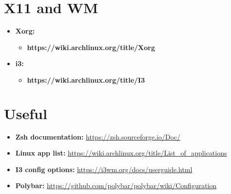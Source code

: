 \documentclass[10pt, a4paper, onecolumn, oneside, titlepage, openany]{book}
\begin{document}
\section{X11 and WM}
\begin{itemize}
    \item \textbf{Xorg:}
    \begin{itemize}
        \item \textbf{https://wiki.archlinux.org/title/Xorg}
    \end{itemize}
    \item \textbf{i3:}
        \begin{itemize}
            \item \textbf{https://wiki.archlinux.org/title/I3}
        \end{itemize}
\end{itemize}

\section{Useful}
\begin{itemize}
    \item \textbf{Zsh documentation:} \url{https://zsh.sourceforge.io/Doc/}
    \item \textbf{Linux app list:} \url{https://wiki.archlinux.org/title/List_of_applications}
    \item \textbf{I3 config options:} \url{https://i3wm.org/docs/userguide.html}
    \item \textbf{Polybar:} \url{https://github.com/polybar/polybar/wiki/Configuration}
\end{itemize}
\end{document}
